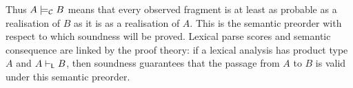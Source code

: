 Thus $A \models_{\mathcal C} B$ means that every observed fragment is at least as probable as a realisation of
$B$ as it is as a realisation of $A$. This is the semantic preorder with respect to which soundness
will be proved. Lexical parse scores and semantic consequence are linked by the proof theory:
if a lexical analysis has product type $A$ and $A \vdash_{\mathsf{L}} B$, then soundness guarantees
that the passage from $A$ to $B$ is valid under this semantic preorder.
